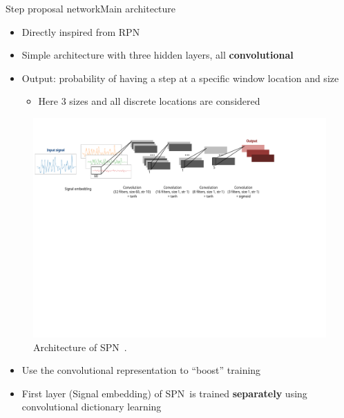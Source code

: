 \documentclass[8pt,t,aspectratio=1610]{beamer}
\newcommand{\subalgo}{{\small\textsc{SPN}}\ }
\begin{document}
\begin{frame}{Step proposal network}{Main architecture}

\begin{itemize}
    \item Directly inspired from RPN
    \item Simple architecture with three hidden layers, all \textbf{convolutional}
    \item Output: probability of having a step at a specific window location and size
    \begin{itemize}
    \item Here 3 sizes and all discrete locations are considered
    \end{itemize}
\end{itemize}

\begin{figure}[h]
    \begin{minipage}{\linewidth}
        \centering
        \includegraphics[width=\linewidth, trim= 0 340 120 40, clip]{schema_cnn_rpn}
        \caption{Architecture of \subalgo.}
    \end{minipage}
\end{figure}

\pause
\begin{itemize}
    \item Use the convolutional representation to ``boost'' training
    \item First layer (Signal embedding) of \subalgo is trained \textbf{separately} using convolutional dictionary learning
\end{itemize}
    
\end{frame}
\end{document}
